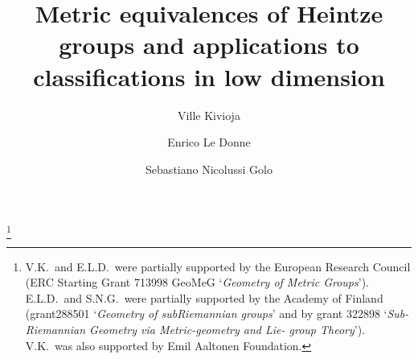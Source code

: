 \documentclass[a4paper,12pt]{amsart}
\newcommand{\pp}{\mathrm}
\theoremstyle{plain}
\theoremstyle{definition}
\theoremstyle{plain}
\theoremstyle{remark}
\begin{document}

\title[Metric equivalences of Heintze groups]{Metric equivalences of Heintze groups and applications to classifications in low dimension}

\author[Kivioja]{Ville Kivioja}

\address[Kivioja and Nicolussi Golo]{
	Department of Mathematics and Statistics, University of Jyv\"askyl\"a, 40014 Jyv\"askyl\"a, Finland}

\author[Le Donne]{Enrico Le Donne}
\address[Le Donne]{Department of Mathematics, University of Fribourg, Fribourg CH-1700, Switzerland}

\author[Golo]{Sebastiano Nicolussi Golo}


\thanks{V.K.\ and
E.L.D.\ were partially supported 
by the European Research Council (ERC Starting Grant 713998 GeoMeG `\emph{Geometry of Metric Groups}'). E.L.D.\ and S.N.G.\ were partially supported by the Academy of Finland (grant288501 `\emph{Geometry of subRiemannian groups}' and by grant 322898 `\emph{Sub-Riemannian Geometry via Metric-geometry and Lie- group Theory}'). V.K.\ was also supported by Emil Aaltonen Foundation. 
  }
 
\newcommand{\piste}{\,.}
\newcommand{\pilkku}{\,,}



\newcommand{\reach}[3]{(#1,#2)^{(#3)}}
\newcommand{\ARe}{\alpha_\pp{sr}}
\newcommand{\AIm}{\alpha_\pp{si}}
\newcommand{\Anil}{\alpha_\pp{nil}}
\newcommand{\aaa}{{\alpha_0}}
\newcommand{\conedim}{\pp{conedim}}
\newcommand{\realshadow}{{\mathbb{R}}}



\renewcommand{\subjclassname}{%
 \textup{2010} Mathematics Subject Classification}
\end{document}
